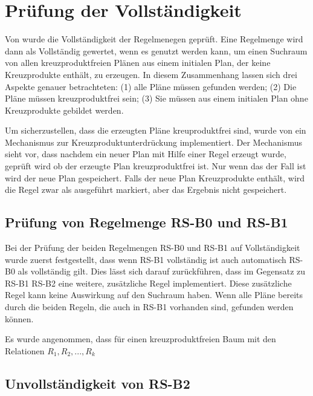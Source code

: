 \section{Prüfung der Vollständigkeit}

Von \cite{shanbhag2014optimizing} wurde die Vollständigkeit der Regelmenegen geprüft. Eine Regelmenge wird dann als Vollständig gewertet, wenn es genutzt werden kann, um einen Suchraum von allen kreuzproduktfreien Plänen aus einem initialen Plan, der keine Kreuzprodukte enthält, zu erzeugen. In diesem Zusammenhang lassen sich drei Aspekte genauer betrachteten: (1) alle Pläne müssen gefunden werden; (2) Die Pläne müssen kreuzproduktfrei sein; (3) Sie müssen aus einem initialen Plan ohne Kreuzprodukte gebildet werden.

Um sicherzustellen, dass die erzeugten Pläne kreuproduktfrei sind, wurde von \cite{shanbhag2014optimizing} ein Mechanismus zur Kreuzproduktunterdrückung implementiert. Der Mechanismus sieht vor, dass nachdem ein neuer Plan mit Hilfe einer Regel erzeugt wurde, geprüft wird ob der erzeugte Plan kreuzproduktfrei ist. Nur wenn das der Fall ist wird der neue Plan gespeichert. Falls der neue Plan Kreuzprodukte enthält, wird die Regel zwar als ausgeführt markiert, aber das Ergebnis nicht gespeichert.


\subsection{Prüfung von Regelmenge RS-B0 und RS-B1}

Bei der Prüfung der beiden Regelmengen RS-B0 und RS-B1 auf Vollständigkeit wurde zuerst festgestellt, dass wenn RS-B1 vollständig ist auch automatisch RS-B0 als vollständig gilt. Dies lässt sich darauf zurückführen, dass im Gegensatz zu RS-B1 RS-B2 eine weitere, zusätzliche Regel implementiert. Diese zusätzliche Regel kann keine Auswirkung auf den Suchraum haben. Wenn alle Pläne bereits durch die beiden Regeln, die auch in RS-B1 vorhanden sind, gefunden werden können.


Es wurde angenommen, dass für einen kreuzproduktfreien Baum mit den Relationen $R_1, R_2, ..., R_k$


\subsection{Unvollständigkeit von RS-B2}

